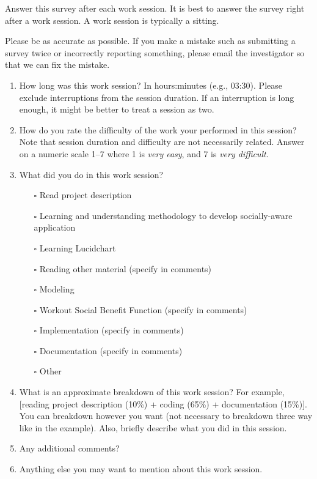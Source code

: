 Answer this survey after each work session. It is best to answer the
survey right after a work session. A work session is typically a
sitting.

Please be as accurate as possible. If you make a mistake such as
submitting a survey twice or incorrectly reporting something, please
email the investigator so that we can fix the mistake.

\begin{enumerate}

\item How long was this work session? In hours:minutes (e.g., 03:30). Please exclude interruptions from the session duration. If an interruption is long enough, it might be better to treat a session as two.
\item How do you rate the difficulty of the work your performed in this session? Note that session duration and difficulty are not necessarily related.
Answer on a numeric scale 1--7 where 1 is \emph{very easy}, and 7 is \emph{very difficult}. 

\item What did you do in this work session? 

\begin{itemize}
\item[$\square$] Read project description
\item[$\square$] Learning and understanding methodology to develop socially-aware application
\item[$\square$] Learning Lucidchart
\item[$\square$] Reading other material (specify in comments)
\item[$\square$] Modeling
\item[$\square$] Workout Social Benefit Function (specify in comments)
\item[$\square$] Implementation (specify in comments)
\item[$\square$] Documentation (specify in comments)
\item[$\square$] Other
\end{itemize}

\item What is an approximate breakdown of this work session? For example, [reading project description (10\%) + coding (65\%) + documentation (15\%)]. You can breakdown however you want (not necessary to breakdown three way like in the example). Also, briefly describe what you did in this session.

\item Any additional comments?
\item Anything else you may want to mention about this work session.

\end{enumerate}

